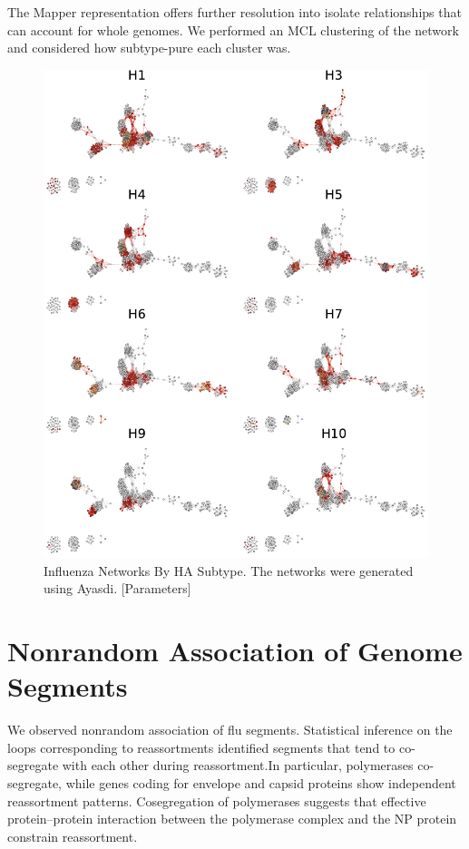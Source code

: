 The Mapper representation offers further resolution into isolate relationships that can account for whole genomes.
We performed an MCL clustering of the network and considered how subtype-pure each cluster was.

\begin{figure}
\centering
\includegraphics[width=\textwidth]{fig/influenza/flu_networks_by_subtype.pdf}
\caption[Influenza Networks By HA Subtype]{Influenza Networks By HA Subtype. The networks were generated using Ayasdi. [Parameters]}
\label{fig:flu:networks_by_subtype}
\end{figure}

\section{Nonrandom Association of Genome Segments}
\label{flu:nonrandom_reassortment}

We observed nonrandom association of flu segments.
Statistical inference on the loops corresponding to reassortments identified segments that tend to co-segregate with each other during reassortment.In particular, polymerases co-segregate, while genes coding for envelope and capsid proteins show independent reassortment patterns.
Cosegregation of polymerases suggests that effective protein–protein interaction between the polymerase complex and the NP protein constrain reassortment. 

